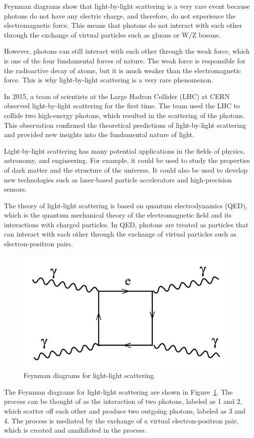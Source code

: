 \documentclass{article}
\begin{document}
Feynman diagrams show that light-by-light scattering is a very rare event because photons do not have any electric charge, and therefore, do not experience the electromagnetic force. This means that photons do not interact with each other through the exchange of virtual particles such as gluons or W/Z bosons.

However, photons can still interact with each other through the weak force, which is one of the four fundamental forces of nature. The weak force is responsible for the radioactive decay of atoms, but it is much weaker than the electromagnetic force. This is why light-by-light scattering is a very rare phenomenon.

In 2015, a team of scientists at the Large Hadron Collider (LHC) at CERN observed light-by-light scattering for the first time. The team used the LHC to collide two high-energy photons, which resulted in the scattering of the photons. This observation confirmed the theoretical predictions of light-by-light scattering and provided new insights into the fundamental nature of light.

Light-by-light scattering has many potential applications in the fields of physics, astronomy, and engineering. For example, it could be used to study the properties of dark matter and the structure of the universe. It could also be used to develop new technologies such as laser-based particle accelerators and high-precision sensors.

The theory of light-light scattering is based on quantum electrodynamics (QED), which is the quantum mechanical theory of the electromagnetic field and its interactions with charged particles. In QED, photons are treated as particles that can interact with each other through the exchange of virtual particles such as electron-positron pairs.

\begin{figure}[h]
	\centering
	\includegraphics[width=0.5\linewidth]{figures/Feynman-diagram.png}
	\caption{Feynman diagrams for light-light scattering.}
	\label{fig:light-light-scattering-feynman}
\end{figure}
The Feynman diagrams for light-light scattering are shown in Figure~\ref{fig:light-light-scattering-feynman}. The process can be thought of as the interaction of two photons, labeled as 1 and 2, which scatter off each other and produce two outgoing photons, labeled as 3 and 4. The process is mediated by the exchange of a virtual electron-positron pair, which is created and annihilated in the process.
\end{document}
